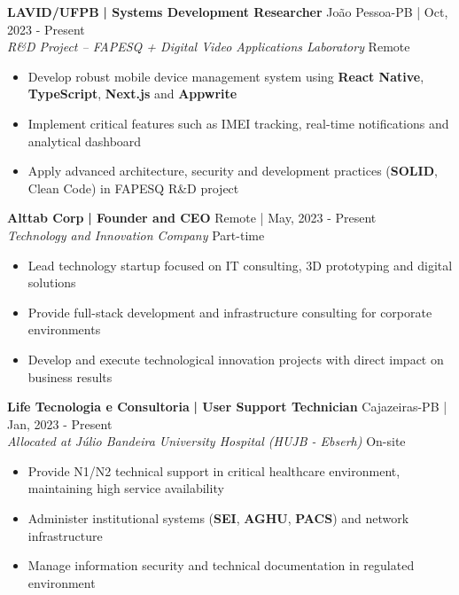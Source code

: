 \documentclass[a4paper]{article}
\begin{document}
\textbf{LAVID/UFPB}\textbf{ | Systems Development Researcher} \hfill João Pessoa-PB | Oct, 2023 - Present\\
\textit{R\&D Project – FAPESQ + Digital Video Applications Laboratory} \hfill Remote\\
\vspace{-3mm}
\begin{itemize} \itemsep -3pt
    \item Develop robust mobile device management system using \textbf{React Native}, \textbf{TypeScript}, \textbf{Next.js} and \textbf{Appwrite}
    \item Implement critical features such as IMEI tracking, real-time notifications and analytical dashboard
    \item Apply advanced architecture, security and development practices (\textbf{SOLID}, Clean Code) in FAPESQ R\&D project
\end{itemize}

\textbf{Alttab Corp}\textbf{ | Founder and CEO} \hfill Remote | May, 2023 - Present\\
\textit{Technology and Innovation Company} \hfill Part-time\\
\vspace{-3mm}
\begin{itemize} \itemsep -3pt
    \item Lead technology startup focused on IT consulting, 3D prototyping and digital solutions
    \item Provide full-stack development and infrastructure consulting for corporate environments
    \item Develop and execute technological innovation projects with direct impact on business results
\end{itemize}

\textbf{Life Tecnologia e Consultoria}\textbf{ | User Support Technician} \hfill Cajazeiras-PB | Jan, 2023 - Present\\
\textit{Allocated at Júlio Bandeira University Hospital (HUJB - Ebserh)} \hfill On-site\\
\vspace{-3mm}
\begin{itemize} \itemsep -3pt
    \item Provide N1/N2 technical support in critical healthcare environment, maintaining high service availability
    \item Administer institutional systems (\textbf{SEI}, \textbf{AGHU}, \textbf{PACS}) and network infrastructure
    \item Manage information security and technical documentation in regulated environment
\end{itemize}
\end{document}
